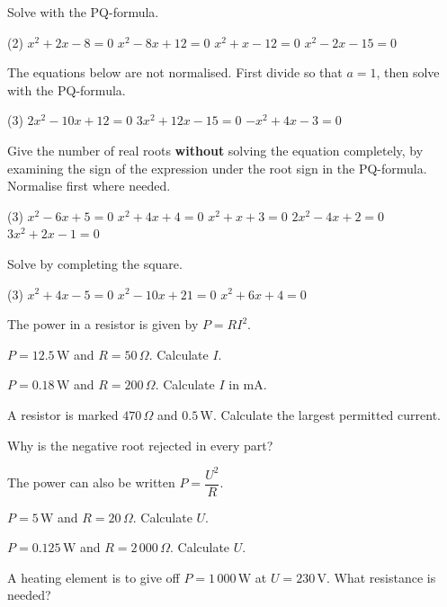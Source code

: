Solve with the PQ-formula.
\begin{delar}(2)
  \task $x^2 + 2x - 8 = 0$
  \task $x^2 - 8x + 12 = 0$
  \task $x^2 + x - 12 = 0$
  \task $x^2 - 2x - 15 = 0$
\end{delar}

The equations below are not normalised. First divide so that $a = 1$, then solve with the
PQ-formula.
\begin{delar}(3)
  \task $2x^2 - 10x + 12 = 0$
  \task $3x^2 + 12x - 15 = 0$
  \task $-x^2 + 4x - 3 = 0$
\end{delar}

Give the number of real roots \textbf{without} solving the equation completely, by examining the
sign of the expression under the root sign in the PQ-formula. Normalise first where needed.
\begin{delar}(3)
  \task $x^2 - 6x + 5 = 0$
  \task $x^2 + 4x + 4 = 0$
  \task $x^2 + x + 3 = 0$
  \task $2x^2 - 4x + 2 = 0$
  \task $3x^2 + 2x - 1 = 0$
\end{delar}

Solve by completing the square.
\begin{delar}(3)
  \task $x^2 + 4x - 5 = 0$
  \task $x^2 - 10x + 21 = 0$
  \task $x^2 + 6x + 4 = 0$
\end{delar}

The power in a resistor is given by $P = RI^2$.
\begin{parts}
  \item $P = 12.5\,\text{W}$ and $R = 50\,\Omega$. Calculate $I$.
  \item $P = 0.18\,\text{W}$ and $R = 200\,\Omega$. Calculate $I$ in mA.
  \item A resistor is marked $470\,\Omega$ and $0.5\,\text{W}$. Calculate the largest permitted
    current.
  \item Why is the negative root rejected in every part?
\end{parts}

The power can also be written $P = \dfrac{U^2}{R}$.
\begin{parts}
  \item $P = 5\,\text{W}$ and $R = 20\,\Omega$. Calculate $U$.
  \item $P = 0.125\,\text{W}$ and $R = 2\,000\,\Omega$. Calculate $U$.
  \item A heating element is to give off $P = 1\,000\,\text{W}$ at $U = 230\,\text{V}$. What
    resistance is needed?
\end{parts}

